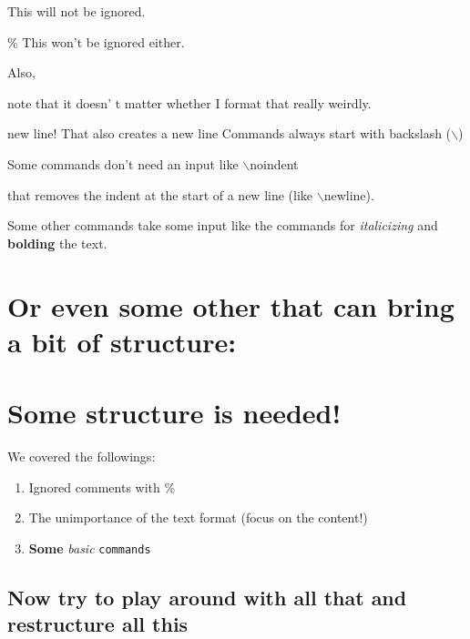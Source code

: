 \documentclass{article} %
\begin{document}


This will not be ignored.

\% This won't be ignored either. %

Also, 







note
that
it doesn'
t
matter                   whether
I
    format that really weirdly.

new line!
\newline
That also creates a new line
\newline
Commands always start with backslash ($\backslash$) %

Some commands don't need an input like $\backslash$noindent %

\noindent that removes the indent at the start of a new line (like $\backslash$newline).


Some other commands take some input like the commands for \textit{italicizing} and \textbf{bolding} the text.
\section{Or even some other that can bring a bit of structure:}
\section{Some structure is needed!}
We covered the followings:

\begin{enumerate} %
\item Ignored comments with \%
\item The unimportance of the text format (focus on the content!)
\item \textbf{Some} \textit{basic} \texttt{commands} %
\end{enumerate}

\subsection*{Now try to play around with all that and restructure all this} %
\end{document}
